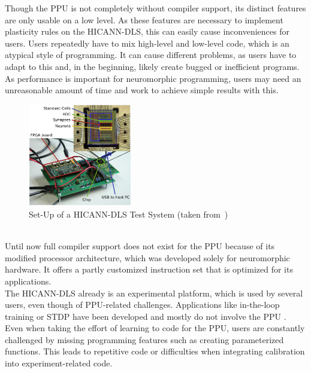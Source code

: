 Though the \ac{PPU} is not completely without compiler support, its distinct features are only usable on a low level.
As these features are necessary to implement plasticity rules on the \ac{HICANN-DLS}, this can easily cause inconveniences for users.
Users repeatedly have to mix high-level and low-level code, which is an atypical style of programming.
It can cause different problems, as users have to adapt to this and, in the beginning, likely create bugged or inefficient programs.
As performance is important for neuromorphic programming, users may need an unreasonable amount of time and work to achieve simple results with this.
\\
\begin{figure}
\captionsetup{format=plain, indention=.6cm, labelsep=newline,singlelinecheck=false}
    \centering
    \includegraphics[width=0.4\textwidth]{pictures/Fig1.png}
    \caption{\label{fig:dlsboard} Set-Up of a \ac{HICANN-DLS} Test System (taken from~\citeauthor{PPU})}
\end{figure}
\\
Until now full compiler support does not exist for the \ac{PPU} because of its modified processor architecture, which was developed solely for neuromorphic hardware.
It offers a partly customized instruction set that is optimized for its applications.
\\
The \ac{HICANN-DLS} already is an experimental platform, which is used by several users, even though of \ac{PPU}-related challenges.
Applications like in-the-loop training or \ac{STDP} have been developed and mostly do not involve the \ac{PPU} .
Even when taking the effort of learning to code for the \ac{PPU}, users are constantly challenged by missing programming features such as creating parameterized functions.
This leads to repetitive code or difficulties when integrating calibration into experiment-related code.

